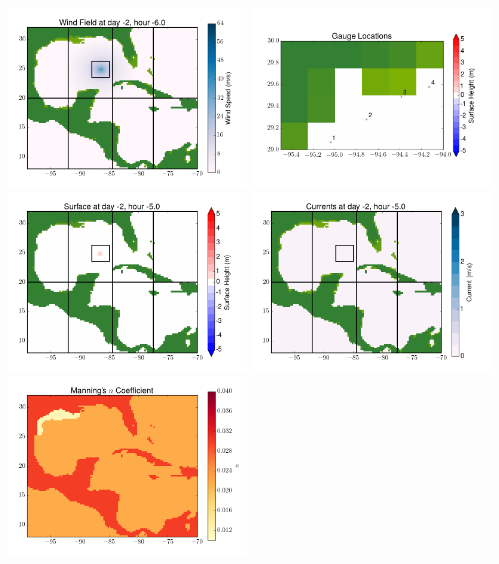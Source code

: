 \documentclass[11pt]{article}
\begin{document}
\vskip 10pt 
\includegraphics[width=0.475\textwidth]{frame0018fig9.png}
\includegraphics[width=0.475\textwidth]{frame0018fig10.png}
\vskip 10pt 
\includegraphics[width=0.475\textwidth]{frame0019fig1.png}
\includegraphics[width=0.475\textwidth]{frame0019fig2.png}
\vskip 10pt 
\includegraphics[width=0.475\textwidth]{frame0019fig3.png}
\end{document}
